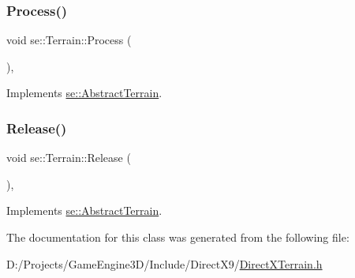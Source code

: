 \subsubsection{\texorpdfstring{Process()}{Process()}}
{\footnotesize\ttfamily void se\+::\+Terrain\+::\+Process (\begin{DoxyParamCaption}{ }\end{DoxyParamCaption})\hspace{0.3cm}{\ttfamily [override]}, {\ttfamily [virtual]}}



Implements \mbox{\hyperlink{classse_1_1_abstract_terrain_af2f0249eead2b62a82baa2ecbb52efeb}{se\+::\+Abstract\+Terrain}}.

\mbox{\label{classse_1_1_terrain_a61004e3426795d93190fe8d1f4159759}} 
\subsubsection{\texorpdfstring{Release()}{Release()}}
{\footnotesize\ttfamily void se\+::\+Terrain\+::\+Release (\begin{DoxyParamCaption}{ }\end{DoxyParamCaption})\hspace{0.3cm}{\ttfamily [override]}, {\ttfamily [virtual]}}



Implements \mbox{\hyperlink{classse_1_1_abstract_terrain_aeee5b6c81be6aee211819b8d79718bf5}{se\+::\+Abstract\+Terrain}}.



The documentation for this class was generated from the following file\+:\begin{DoxyCompactItemize}
\item 
D\+:/\+Projects/\+Game\+Engine3\+D/\+Include/\+Direct\+X9/\mbox{\hyperlink{_direct_x_terrain_8h}{Direct\+X\+Terrain.\+h}}\end{DoxyCompactItemize}
